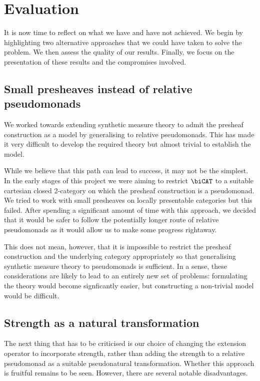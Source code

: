 \chapter{Evaluation}

It is now time to reflect on what we have and have not achieved. We begin
by highlighting two alternative approaches that we could have taken to solve
the problem. We then assess the quality of our results. Finally, we focus
on the presentation of these results and the compromises involved.

\section{Small presheaves instead of relative pseudomonads}\label{sec:small_presheaves}

We worked towards extending synthetic measure theory to admit the presheaf
construction as a model by generalising to relative pseudomonads. This has made
it very difficult to develop the required theory but almost trivial to establish
the model.

While we believe that this path can lead to success, it may not be the simplest.
In the early stages of this project we were aiming to restrict $\biCAT$ to a
suitable cartesian closed 2-category on which the presheaf construction is a
pseudomonad. We tried to work with small presheaves on locally presentable
categories but this failed. After spending a significant amount of time with
this approach, we decided that it would be safer to follow the potentially
longer route of relative pseudomonads as it would allow us to make some progress
rightaway.

This does not mean, however, that it is impossible to restrict the presheaf
construction and the underlying category appropriately so that generalising
synthetic measure theory to pseudomonads is sufficient. In a sense, these
considerations are likely to lead to an entirely new set of problems:
formulating the theory would become signficantly easier, but constructing a
non-trivial model would be difficult.

\section{Strength as a natural transformation}

The next thing that has to be criticised is our choice of changing the extension
operator to incorporate strength, rather than adding the strength to a relative
pseudomonad as a suitable pseudonatural transformation. Whether this approach is
fruitful remains to be seen. However, there are several notable disadvantages.

